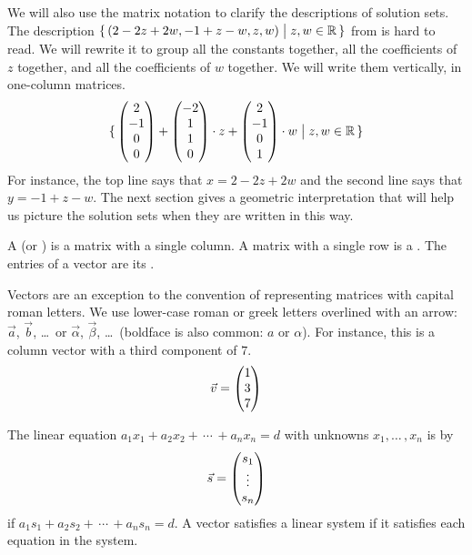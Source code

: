 We will also use the matrix notation
to clarify the descriptions of solution sets.
The description
$\mbox{$\{\,(2-2z+2w,-1+z-w,z,w)\bigm| z,w\in\mathbb{R}\,\}$}$ 
from  is hard to read.
We will rewrite it to group all the
constants together, all the
coefficients of \( z \) together, and all the coefficients of \( w \)
together.
We will write them vertically, in one-column matrices.
\begin{equation*}
  \mbox{$\{\,\begin{pmatrix} 2 \\ -1 \\ 0 \\ 0 \end{pmatrix}
       +\begin{pmatrix} -2 \\ 1 \\ 1 \\ 0 \end{pmatrix}\cdot z
       +\begin{pmatrix} 2 \\ -1 \\ 0 \\ 1 \end{pmatrix}\cdot w
       \bigm| z,w\in\mathbb{R}\,\}$}
\end{equation*}
For instance, the top line says that \( x=2-2z+2w \)
and the second line says that \( y= -1+z-w \).
The next section gives a geometric interpretation that will help us
picture the solution sets when they are written in this way.

\begin{definition}
A  
(or )
is a matrix with a single column.
A matrix with a single row is a
.
The entries of a vector are its
.
\end{definition}

Vectors are an exception to the convention of representing matrices with 
capital roman letters.
We use lower-case roman or greek letters overlined
with an arrow:
\( \vec{a} \), \( \vec{b} \), \ldots\, or
\( \vec{\alpha} \), \( \vec{\beta} \), \ldots\
(boldface is also common:
{\boldmath \( a \)} or {\boldmath \( \alpha \)}).
For instance, this is a column vector
with a third component of \( 7 \).
\begin{equation*}
  \vec{v}=
  \begin{pmatrix}  1  \\  3  \\ 7 \end{pmatrix}
\end{equation*}

\begin{definition}
The linear equation
\( a_1x_1+a_2x_2+\,\cdots\,+a_nx_n=d \)
with unknowns \( x_1,\ldots\,,x_n \)
is %
 by
\begin{equation*}
  \vec{s}=\begin{pmatrix} s_1 \\ \vdots \\ s_n \end{pmatrix}
\end{equation*}
if \( a_1s_1+a_2s_2+\,\cdots\,+a_ns_n=d \).
A vector satisfies a linear system if it satisfies each equation in 
the system.
\end{definition}

